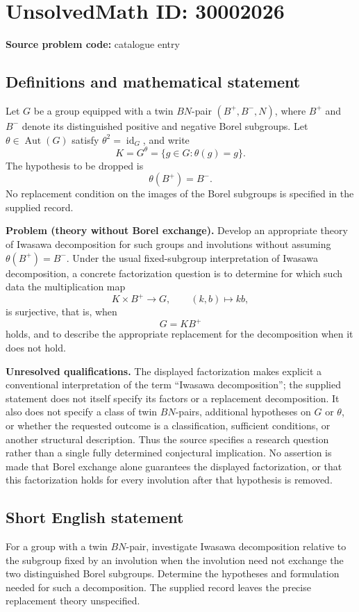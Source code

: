\documentclass[11pt]{article}
\begin{document}
\section*{UnsolvedMath ID: 30002026}
\textbf{Source problem code:} catalogue entry
\subsection{Definitions and mathematical statement}
Let \(G\) be a group equipped with a twin \(BN\)-pair \((B^+,B^-,N)\), where \(B^+\) and \(B^-\) denote its distinguished positive and negative Borel subgroups. Let \(\theta\in\operatorname{Aut}(G)\) satisfy \(\theta^2=\operatorname{id}_G\), and write
\[
K=G^\theta=\{g\in G:\theta(g)=g\}.
\]
The hypothesis to be dropped is
\[
\theta(B^+)=B^-.
\]
No replacement condition on the images of the Borel subgroups is specified in the supplied record.

\textbf{Problem (theory without Borel exchange).} Develop an appropriate theory of Iwasawa decomposition for such groups and involutions without assuming \(\theta(B^+)=B^-\). Under the usual fixed-subgroup interpretation of Iwasawa decomposition, a concrete factorization question is to determine for which such data the multiplication map
\[
K\times B^+\longrightarrow G,\qquad (k,b)\longmapsto kb,
\]
is surjective, that is, when
\[
G=KB^+
\]
holds, and to describe the appropriate replacement for the decomposition when it does not hold.

\textbf{Unresolved qualifications.} The displayed factorization makes explicit a conventional interpretation of the term ``Iwasawa decomposition''; the supplied statement does not itself specify its factors or a replacement decomposition. It also does not specify a class of twin \(BN\)-pairs, additional hypotheses on \(G\) or \(\theta\), or whether the requested outcome is a classification, sufficient conditions, or another structural description. Thus the source specifies a research question rather than a single fully determined conjectural implication. No assertion is made that Borel exchange alone guarantees the displayed factorization, or that this factorization holds for every involution after that hypothesis is removed.
\subsection{Short English statement}
For a group with a twin \(BN\)-pair, investigate Iwasawa decomposition relative to the subgroup fixed by an involution when the involution need not exchange the two distinguished Borel subgroups. Determine the hypotheses and formulation needed for such a decomposition. The supplied record leaves the precise replacement theory unspecified.
\end{document}
